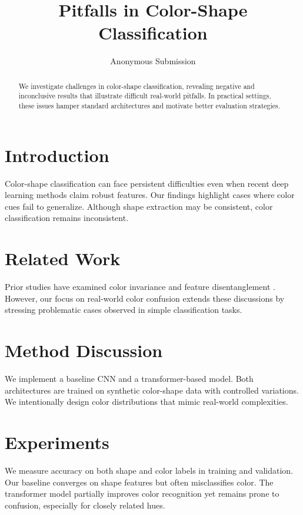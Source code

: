 \documentclass{article}
\begin{document}
\title{Pitfalls in Color-Shape Classification}
\author{Anonymous Submission}
\date{}
\maketitle

\begin{abstract}
We investigate challenges in color-shape classification, revealing negative and inconclusive results that illustrate difficult real-world pitfalls. In practical settings, these issues hamper standard architectures and motivate better evaluation strategies.
\end{abstract}

\section{Introduction}
Color-shape classification can face persistent difficulties even when recent deep learning methods claim robust features. Our findings highlight cases where color cues fail to generalize. Although shape extraction may be consistent, color classification remains inconsistent.

\section{Related Work}
Prior studies have examined color invariance and feature disentanglement \cite{placeholder2025}. However, our focus on real-world color confusion extends these discussions by stressing problematic cases observed in simple classification tasks.

\section{Method Discussion}
We implement a baseline CNN and a transformer-based model. Both architectures are trained on synthetic color-shape data with controlled variations. We intentionally design color distributions that mimic real-world complexities.

\section{Experiments}
We measure accuracy on both shape and color labels in training and validation. Our baseline converges on shape features but often misclassifies color. The transformer model partially improves color recognition yet remains prone to confusion, especially for closely related hues.
\end{document}
